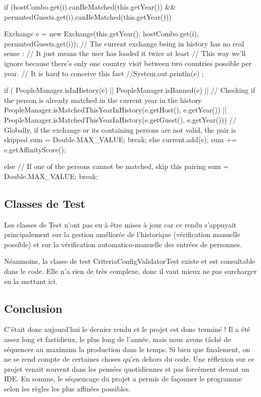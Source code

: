 \documentclass{mytex}
\begin{document}
\begin{codebox}
if (hostCombo.get(i).canBeMatched(this.getYear()) && permutedGuests.get(i).canBeMatched(this.getYear())) {
	Exchange e = new Exchange(this.getYear(), hostCombo.get(i), permutedGuests.get(i));
	// The current exchange being in history has no real sense :
	// It just means the user has loaded it twice at least
	// This way we'll ignore because there's only one country visit between two countries possible per year.
	// It is hard to conceive this fact
	//System.out.println(e) ;
	
	if (
	PeopleManager.isInHistory(e) || 
	PeopleManager.isBanned(e) || 
	// Checking if the person is already matched in the current year in the history
	PeopleManager.isMatchedThisYearInHistory(e.getHost(), e.getYear()) ||
	PeopleManager.isMatchedThisYearInHistory(e.getGuest(), e.getYear())) {
		// Globally, if the exchange or its containing persons are not valid, the pair is skipped
		sum = Double.MAX_VALUE;
		break;
	} else {
		current.add(e);
	}
	sum += e.getAffinityScore();
	
} else {
	// If one of the persons cannot be matched, skip this pairing
	sum = Double.MAX_VALUE;
	break;
}
\end{codebox}

\subsection{Classes de Test}

Les classes de Test n'ont pas eu à être mises à jour car ce rendu s'appuyait principalement sur la gestion améliorée de l'historique (vérification manuelle possible) et sur la vérification automatico-manuelle des entrées de personnes.

Néanmoins, la classe de test CriteriaConfigValidatorTest existe et est consultable dans le code. Elle n'a rien de très complexe, donc il vaut mieux ne pas surcharger en la mettant ici. 

\subsection{Conclusion}

C'était donc aujourd'hui le dernier rendu et le projet est donc terminé ! Il a été assez long et fastidieux, le plus long de l'année, mais nous avons tâché de séquencer au maximum la production dans le temps. Si bien que finalement, on ne se rend compte de certaines choses qu'en dehors du code. Une réflexion sur ce projet venait souvent dans les pensées quotidiennes et pas forcément devant un IDE. En somme, le séquencage du projet a permis de façonner le programme selon les règles les plus affinées possibles.
\end{document}
